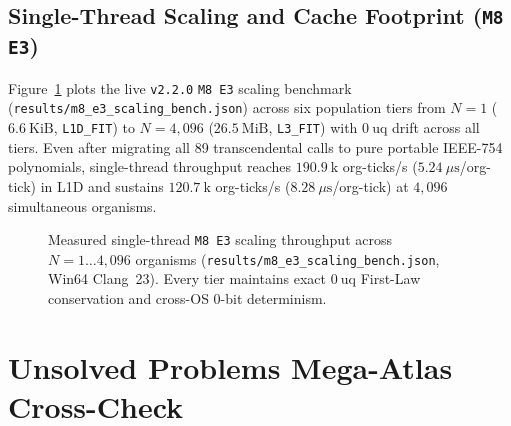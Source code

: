 \documentclass[11pt,reqno]{amsart}
\theoremstyle{remark}
\begin{document}
\subsection{Single-Thread Scaling and Cache Footprint (\texttt{M8 E3})}
\label{subsec:bench}

Figure~\ref{fig:scaling} plots the live \texttt{v2.2.0} \texttt{M8 E3} scaling benchmark (\texttt{results/m8\_e3\_scaling\_bench.json}) across six population tiers from $N = 1$ ($6.6~\text{KiB}$, \texttt{L1D\_FIT}) to $N = 4{,}096$ ($26.5~\text{MiB}$, \texttt{L3\_FIT}) with $0~\text{uq}$ drift across all tiers. Even after migrating all 89 transcendental calls to pure portable IEEE-754 polynomials, single-thread throughput reaches $190.9~\text{k}$ org-ticks/s ($5.24~\mu\text{s}$/org-tick) in L1D and sustains $120.7~\text{k}$ org-ticks/s ($8.28~\mu\text{s}$/org-tick) at $4{,}096$ simultaneous organisms.

\begin{figure}[ht]
\centering
{}
\caption{Measured single-thread \texttt{M8 E3} scaling throughput across $N = 1 \dots 4{,}096$ organisms (\texttt{results/m8\_e3\_scaling\_bench.json}, Win64 Clang~23). Every tier maintains exact $0~\text{uq}$ First-Law conservation and cross-OS 0-bit determinism.}
\label{fig:scaling}
\end{figure}

\section{Unsolved Problems Mega-Atlas Cross-Check}
\label{sec:atlas}
\end{document}

